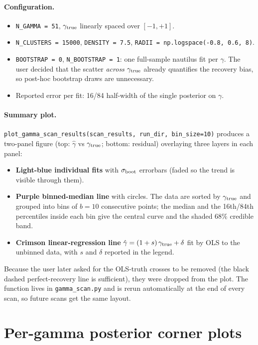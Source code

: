 \documentclass[11pt,a4paper]{article}
\newcommand{\gtrue}{\gamma_{\rm true}}
\newcommand{\gest}{\hat\gamma}
\begin{document}
\paragraph{Configuration.}
\begin{itemize}
\item \verb|N_GAMMA = 51|, $\gtrue$ linearly spaced over $[-1, +1]$.
\item \verb|N_CLUSTERS = 15000|, \verb|DENSITY = 7.5|,
      \verb|RADII = np.logspace(-0.8, 0.6, 8)|.
\item \verb|BOOTSTRAP = 0|, \verb|N_BOOTSTRAP = 1|: one full-sample
      nautilus fit per $\gamma$. The user decided that the scatter
      \emph{across} $\gtrue$ already quantifies the recovery bias, so
      post-hoc bootstrap draws are unnecessary.
\item Reported error per fit: 16/84 half-width of the single
      posterior on $\gamma$.
\end{itemize}

\paragraph{Summary plot.}
\verb|plot_gamma_scan_results(scan_results, run_dir, bin_size=10)|
produces a two-panel figure (top: $\gest$ vs $\gtrue$; bottom: residual)
overlaying three layers in each panel:
\begin{itemize}
\item \textbf{Light-blue individual fits} with $\sigma_{\rm boot}$
      errorbars (faded so the trend is visible through them).
\item \textbf{Purple binned-median line} with circles. The data are
      sorted by $\gtrue$ and grouped into bins of $b = 10$ consecutive
      points; the median and the 16th/84th percentiles inside each bin
      give the central curve and the shaded 68\% credible band.
\item \textbf{Crimson linear-regression line}
      $\gest = (1 + s)\,\gtrue + \delta$ fit by OLS to the unbinned
      data, with $s$ and $\delta$ reported in the legend.
\end{itemize}
Because the user later asked for the OLS-truth crosses to be removed
(the black dashed perfect-recovery line is sufficient), they were
dropped from the plot. The function lives in
\verb|gamma_scan.py| and is rerun automatically at the end of every
scan, so future scans get the same layout.


\section{Per-gamma posterior corner plots}
\label{sec:corner}
\end{document}
